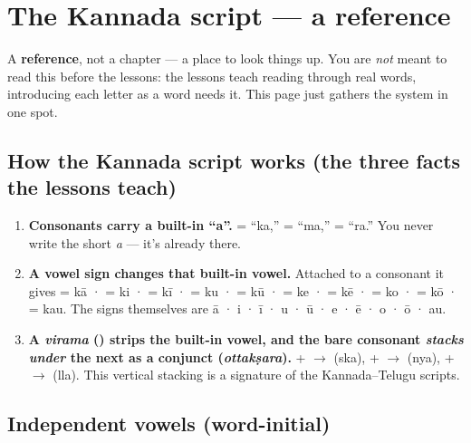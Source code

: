 
\chapter*{The Kannada script --- a reference}

A \textbf{reference}, not a chapter — a place to look things up. You are \emph{not} meant to read this before the lessons: the lessons teach reading through real words, introducing each letter as a word needs it. This page just gathers the system in one spot.

\section*{How the Kannada script works (the three facts the lessons teach)}

\begin{enumerate}
\raggedright
\setlength{\itemsep}{0.35em}
  \item \textbf{Consonants carry a built-in \textquotedblleft{}a\textquotedblright{}.}  = \textquotedblleft{}ka,\textquotedblright{}  = \textquotedblleft{}ma,\textquotedblright{}  = \textquotedblleft{}ra.\textquotedblright{} You never write the short \emph{a} — it's already there.
  \item \textbf{A vowel sign changes that built-in vowel.} Attached to a consonant it gives  = kā ·  = ki ·  = kī ·  = ku ·  = kū ·  = ke ·  = kē ·  = ko ·  = kō ·  = kau. The signs themselves are \textbf{} ā · \textbf{} i · \textbf{} ī · \textbf{} u · \textbf{} ū · \textbf{} e · \textbf{} ē · \textbf{} o · \textbf{} ō · \textbf{} au.
  \item \textbf{A \emph{virama} () strips the built-in vowel, and the bare consonant \emph{stacks under} the next as a conjunct (\emph{ottakṣara}).}  +  $\to$  (ska),  +  $\to$  (nya),  +  $\to$  (lla). This vertical stacking is a signature of the Kannada–Telugu scripts.
\end{enumerate}

\section*{Independent vowels (word-initial)}

